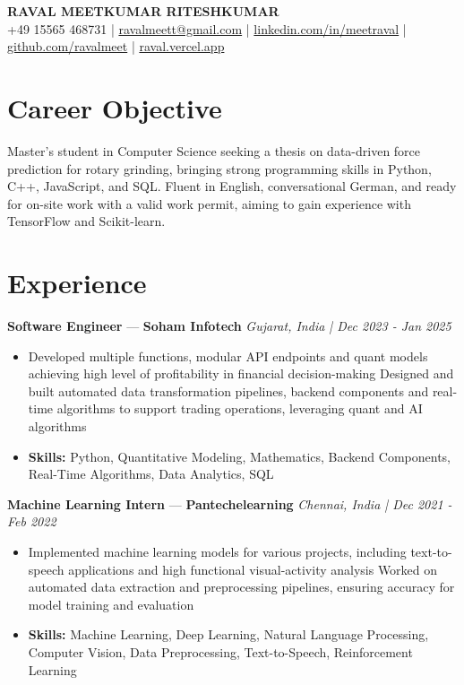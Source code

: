 \documentclass[a4paper,10pt]{article}
\begin{document}
\begin{center}
  {\Large\bfseries RAVAL MEETKUMAR RITESHKUMAR}\\[2pt]
  {\small +49 15565 468731 \;|\; \href{mailto:ravalmeett@gmail.com}{ravalmeett@gmail.com} \;|\; \href{https://www.linkedin.com/in/meetraval/}{linkedin.com/in/meetraval} \;|\; \href{https://github.com/ravalmeet}{github.com/ravalmeet} \;|\; \href{https://raval.vercel.app/}{raval.vercel.app}}
\end{center}
\vspace{-3pt}

\section*{Career Objective}
Master's student in Computer Science seeking a thesis on data-driven force prediction for rotary grinding, bringing strong programming skills in Python, C++, JavaScript, and SQL. Fluent in English, conversational German, and ready for on-site work with a valid work permit, aiming to gain experience with TensorFlow and Scikit-learn.\par

\section*{Experience}
\textbf{Software Engineer} — \textbf{Soham Infotech} \hfill \textit{Gujarat, India \;|\; Dec 2023 - Jan 2025}\par
\vspace{1pt}
\begin{itemize}
  \item Developed multiple functions, modular API endpoints and quant models achieving high level of profitability in financial decision-making Designed and built automated data transformation pipelines, backend components and real-time algorithms to support trading operations, leveraging quant and AI algorithms
  \item \textbf{Skills:} Python, Quantitative Modeling, Mathematics, Backend Components, Real-Time Algorithms, Data Analytics, SQL
\end{itemize}
\vspace{3pt}
\textbf{Machine Learning Intern} — \textbf{Pantechelearning} \hfill \textit{Chennai, India \;|\; Dec 2021 - Feb 2022}\par
\vspace{1pt}
\begin{itemize}
  \item Implemented machine learning models for various projects, including text-to-speech applications and high functional visual-activity analysis Worked on automated data extraction and preprocessing pipelines, ensuring accuracy for model training and evaluation
  \item \textbf{Skills:} Machine Learning, Deep Learning, Natural Language Processing, Computer Vision, Data Preprocessing, Text-to-Speech, Reinforcement Learning
\end{itemize}
\end{document}
